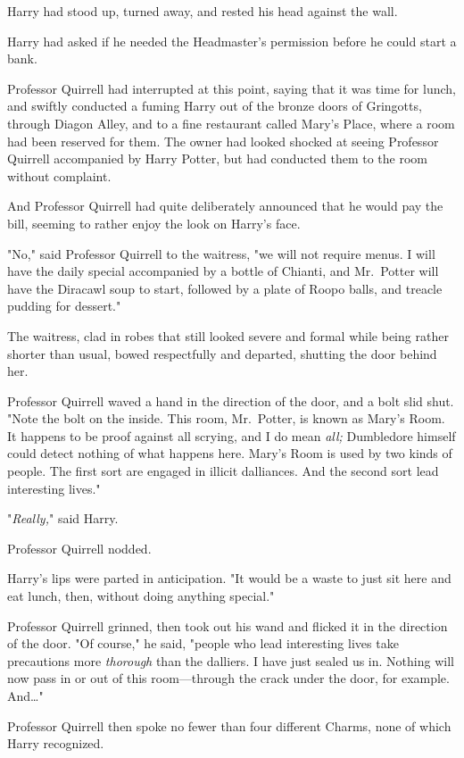 Harry had stood up, turned away, and rested his head against the wall.

Harry had asked if he needed the Headmaster's permission before he could start
a bank.

Professor Quirrell had interrupted at this point, saying that it was time for
lunch, and swiftly conducted a fuming Harry out of the bronze doors of
Gringotts, through Diagon Alley, and to a fine restaurant called Mary's Place,
where a room had been reserved for them. The owner had looked shocked at seeing
Professor Quirrell accompanied by Harry Potter, but had conducted them to the
room without complaint.

And Professor Quirrell had quite deliberately announced that he would pay the
bill, seeming to rather enjoy the look on Harry's face.

"No," said Professor Quirrell to the waitress, "we will not require menus. I
will have the daily special accompanied by a bottle of Chianti, and Mr.~Potter
will have the Diracawl soup to start, followed by a plate of Roopo balls, and
treacle pudding for dessert."

The waitress, clad in robes that still looked severe and formal while being
rather shorter than usual, bowed respectfully and departed, shutting the door
behind her.

Professor Quirrell waved a hand in the direction of the door, and a bolt slid
shut. "Note the bolt on the inside. This room, Mr.~Potter, is known as Mary's
Room. It happens to be proof against all scrying, and I do mean \emph{all;}
Dumbledore himself could detect nothing of what happens here. Mary's Room is
used by two kinds of people. The first sort are engaged in illicit dalliances.
And the second sort lead interesting lives."

"\emph{Really,}" said Harry.

Professor Quirrell nodded.

Harry's lips were parted in anticipation. "It would be a waste to just sit here
and eat lunch, then, without doing anything special."

Professor Quirrell grinned, then took out his wand and flicked it in the
direction of the door. "Of course," he said, "people who lead interesting lives
take precautions more \emph{thorough} than the dalliers. I have just sealed us
in. Nothing will now pass in or out of this room---through the crack under the
door, for example. And{\ldots}"

Professor Quirrell then spoke no fewer than four different Charms, none of
which Harry recognized.

